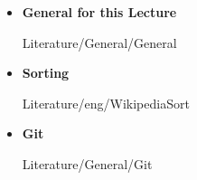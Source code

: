 \begin{itemize}
  \item
    \textbf{General for this Lecture}
    \begin{btSect}{Literature/General/General}
      \btPrintAll
    \end{btSect}
\end{itemize}
\newpage
\begin{itemize}
  \item
    \textbf{Sorting}
    \begin{btSect}{Literature/eng/WikipediaSort}
      \btPrintAll
    \end{btSect}
\end{itemize}
\newpage
\begin{itemize}
  \item
    \textbf{Git}
    \begin{btSect}{Literature/General/Git}
      \btPrintAll
    \end{btSect}
\end{itemize}
\newpage